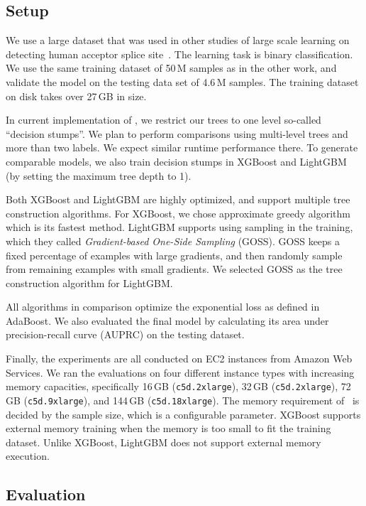 \subsection{Setup}

We use a large dataset that was used in other studies of large scale
learning on detecting human acceptor splice site~\cite{sonnenburg_coffin_2010, agarwal_reliable_2014}.
The learning task is binary classification.
We use the same training dataset of 50\,M samples as in the other work,
and validate the model on the testing data set of 4.6\,M samples.
The training dataset on disk takes over 27\,GB in size.

In current implementation of \Sparrow, we restrict our trees to one
level so-called ``decision stumps''. We plan to perform comparisons
using multi-level trees and more than two labels. We expect similar
runtime performance there. To generate comparable models,
we also train decision stumps in XGBoost and LightGBM
(by setting the maximum tree depth to 1).

Both XGBoost and LightGBM are highly optimized, and support multiple
tree construction algorithms.
For XGBoost, we chose approximate greedy algorithm which is its fastest method.
LightGBM supports using sampling in the training,
which they called \textit{Gradient-based One-Side Sampling} (GOSS).
GOSS keeps a fixed percentage of examples with large gradients,
and then randomly sample from remaining examples with small gradients.
We selected GOSS as the tree construction algorithm for LightGBM.

All algorithms in comparison optimize the exponential loss as defined in AdaBoost.
We also evaluated the final model by calculating its area under precision-recall
curve (AUPRC) on the testing dataset.

Finally, the experiments are all conducted on EC2 instances from Amazon Web Services.
We ran the evaluations on four different instance types with increasing memory capacities,
specifically
16\,GB (\texttt{c5d.2xlarge}), 32\,GB (\texttt{c5d.2xlarge}),
72\,GB (\texttt{c5d.9xlarge}), and 144\,GB (\texttt{c5d.18xlarge}).
The memory requirement of \Sparrow\ is decided by the sample size,
which is a configurable parameter.
XGBoost supports external memory training when the memory is too small to fit the
training dataset.
Unlike XGBoost, LightGBM does not support external memory execution.


\subsection{Evaluation}

